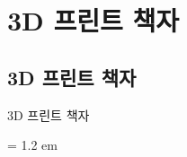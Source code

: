 \documentclass[12pt, a4paper, oneside]{book}
\let\stdsection\section
\renewcommand\section{\newpage\stdsection}
\begin{document}
%
	\chapter{3D 프린트 책자}


%
	\section{3D 프린트 책자}


			\begin{table} [h]														
			\caption{3D 프린트 책자}
			\label{tab:title}														
			\tabulinesep=		1.2	em
			\end{table}														
\end{document}
